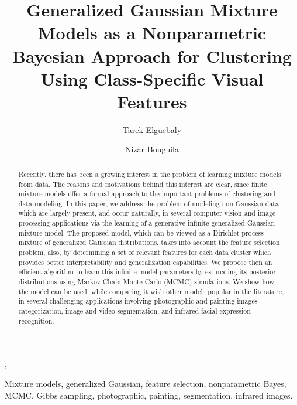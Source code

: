 \documentclass[journal,10pt]{elsart}
\begin{document}
\begin{frontmatter}


\title{Generalized Gaussian Mixture Models as a Nonparametric Bayesian Approach for Clustering Using Class-Specific Visual Features}

\author{Tarek Elguebaly} , \author{Nizar Bouguila }
\address{Concordia Institute for Information Systems Engineering,
Faculty of Engineering and Computer Science, Concordia University,
Montreal, Qc, Canada H3G 2W1}
\begin{abstract}
Recently, there has been a growing interest in the problem of learning mixture models from data. The reasons and motivations behind this interest are clear, since finite mixture models offer a formal approach to the important problems of clustering and data modeling. In this paper, we address the problem of modeling non-Gaussian data which are largely present, and occur naturally, in several computer vision and image processing applications via the learning of a generative infinite generalized Gaussian mixture model. The proposed model, which can be viewed as a Dirichlet process mixture of generalized Gaussian distributions, takes into account the feature selection problem, also, by determining a set of relevant features for each data cluster which provides better interpretability and generalization capabilities. We propose then an efficient algorithm to learn this infinite model parameters by estimating its posterior distributions using Markov Chain Monte Carlo (MCMC) simulations. We show how the model can be used, while comparing it with other models popular in the literature, in several challenging applications involving photographic and painting images categorization, image and video segmentation, and infrared facial expression recognition.
\end{abstract}
\begin{keyword}
Mixture models, generalized Gaussian, feature selection, nonparametric Bayes, MCMC, Gibbs sampling, photographic, painting, segmentation, infrared images.
\end{keyword}
\end{frontmatter}
\end{document}
